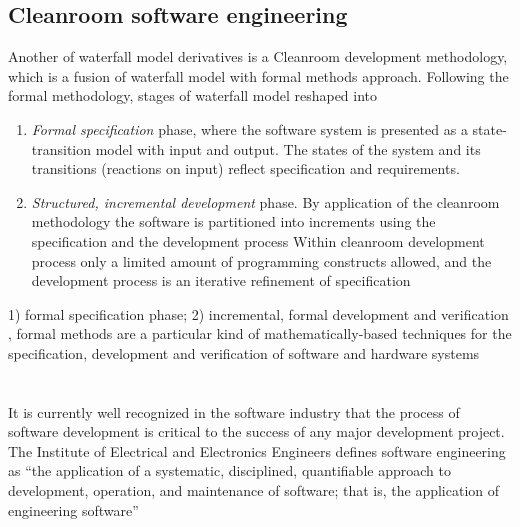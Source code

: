 \subsection{Cleanroom software engineering}
Another of waterfall model derivatives is a Cleanroom development methodology, which is
a fusion of waterfall model with formal methods approach. 
Following the formal methodology, stages of waterfall model reshaped into 
\begin{enumerate}
 \item \textit{Formal specification} phase, where the software system is presented as 
a state-transition model with input and output. The states of the system and
its transitions (reactions on input) reflect specification and requirements.
 \item \textit{Structured, incremental development} phase. By application of the 
cleanroom methodology the software is partitioned into increments using the 
specification and the development process Within cleanroom
development process only a limited amount of programming constructs allowed,
and the development process is an iterative refinement of specification
\end{enumerate}

1) formal specification phase; 2) incremental, formal development and verification 
, formal methods are a particular kind of mathematically-based techniques for
the specification, development and verification of software and hardware systems

\section{}

It is currently well recognized in the software industry that the process of software development 
is critical to the success of any major development project.
The Institute of Electrical and Electronics Engineers defines software engineering as 
“the application of a systematic, disciplined, quantifiable approach to development, 
operation, and maintenance of software; that is, the application of engineering software”
